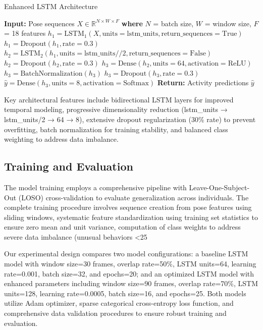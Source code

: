 \documentclass{iopconfser}
\begin{document}
\begin{algorithm}[H]
\caption{Enhanced LSTM Architecture}
\begin{algorithmic}[1]
\STATE \textbf{Input:} Pose sequences $X \in \mathbb{R}^{N \times W \times F}$
\STATE \textbf{where} $N$ = batch size, $W$ = window size, $F$ = 18 features
\STATE 
\STATE $h_1 = \text{LSTM}_1(X, \text{units}=\text{lstm\_units}, \text{return\_sequences}=\text{True})$
\STATE $h_1 = \text{Dropout}(h_1, \text{rate}=0.3)$
\STATE 
\STATE $h_2 = \text{LSTM}_2(h_1, \text{units}=\text{lstm\_units}//2, \text{return\_sequences}=\text{False})$
\STATE $h_2 = \text{Dropout}(h_2, \text{rate}=0.3)$
\STATE 
\STATE $h_3 = \text{Dense}(h_2, \text{units}=64, \text{activation}=\text{ReLU})$
\STATE $h_3 = \text{BatchNormalization}(h_3)$
\STATE $h_3 = \text{Dropout}(h_3, \text{rate}=0.3)$
\STATE 
\STATE $\hat{y} = \text{Dense}(h_3, \text{units}=8, \text{activation}=\text{Softmax})$
\STATE \textbf{Return:} Activity predictions $\hat{y}$
\end{algorithmic}
\end{algorithm}

Key architectural features include bidirectional LSTM layers for improved temporal modeling, progressive dimensionality reduction (lstm\_units → lstm\_units/2 → 64 → 8), extensive dropout regularization (30\% rate) to prevent overfitting, batch normalization for training stability, and balanced class weighting to address data imbalance.

\subsection{Training and Evaluation}

The model training employs a comprehensive pipeline with Leave-One-Subject-Out (LOSO) cross-validation to evaluate generalization across individuals. The complete training procedure involves sequence creation from pose features using sliding windows, systematic feature standardization using training set statistics to ensure zero mean and unit variance, computation of class weights to address severe data imbalance (unusual behaviors <25%

Our experimental design compares two model configurations: a baseline LSTM model with window size=30 frames, overlap rate=50\%, LSTM units=64, learning rate=0.001, batch size=32, and epochs=20; and an optimized LSTM model with enhanced parameters including window size=90 frames, overlap rate=70\%, LSTM units=128, learning rate=0.0005, batch size=16, and epochs=25. Both models utilize Adam optimizer, sparse categorical cross-entropy loss function, and comprehensive data validation procedures to ensure robust training and evaluation.
\end{document}
